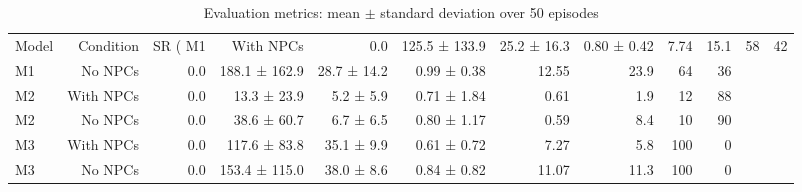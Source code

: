 \begin{table}[t]
\centering
\caption{Evaluation metrics: mean $\pm$ standard deviation over 50 episodes}
\label{tab:results}
\begin{tabular}{lrrrrrrrrr}
\toprule
Model & Condition & SR (%
\midrule
M1 & With NPCs & 0.0 & 125.5 ± 133.9 & 25.2 ± 16.3 & 0.80 ± 0.42 & 7.74 & 15.1 & 58 & 42 \\
M1 & No NPCs & 0.0 & 188.1 ± 162.9 & 28.7 ± 14.2 & 0.99 ± 0.38 & 12.55 & 23.9 & 64 & 36 \\
M2 & With NPCs & 0.0 & 13.3 ± 23.9 & 5.2 ± 5.9 & 0.71 ± 1.84 & 0.61 & 1.9 & 12 & 88 \\
M2 & No NPCs & 0.0 & 38.6 ± 60.7 & 6.7 ± 6.5 & 0.80 ± 1.17 & 0.59 & 8.4 & 10 & 90 \\
M3 & With NPCs & 0.0 & 117.6 ± 83.8 & 35.1 ± 9.9 & 0.61 ± 0.72 & 7.27 & 5.8 & 100 & 0 \\
M3 & No NPCs & 0.0 & 153.4 ± 115.0 & 38.0 ± 8.6 & 0.84 ± 0.82 & 11.07 & 11.3 & 100 & 0 \\
\bottomrule
\end{tabular}
\end{table}
